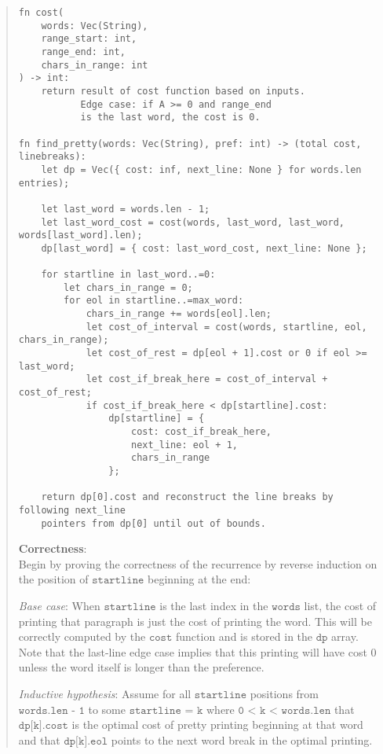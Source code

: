 \documentclass[11pt]{article}
\newcommand{\code}[1]{$\texttt{#1}$}
\begin{document}
\begin{enumerate}
\begin{enumerate}
\begin{quote}
\newpage
\begin{Verbatim}[xleftmargin=-6em]
fn cost(
    words: Vec(String), 
    range_start: int, 
    range_end: int, 
    chars_in_range: int
) -> int:
    return result of cost function based on inputs. 
           Edge case: if A >= 0 and range_end 
           is the last word, the cost is 0.

fn find_pretty(words: Vec(String), pref: int) -> (total cost, linebreaks):
    let dp = Vec({ cost: inf, next_line: None } for words.len entries);

    let last_word = words.len - 1;
    let last_word_cost = cost(words, last_word, last_word, words[last_word].len);
    dp[last_word] = { cost: last_word_cost, next_line: None };

    for startline in last_word..=0:
        let chars_in_range = 0;
        for eol in startline..=max_word:
            chars_in_range += words[eol].len;
            let cost_of_interval = cost(words, startline, eol, chars_in_range);
            let cost_of_rest = dp[eol + 1].cost or 0 if eol >= last_word;
            let cost_if_break_here = cost_of_interval + cost_of_rest;
            if cost_if_break_here < dp[startline].cost:
                dp[startline] = {
                    cost: cost_if_break_here,
                    next_line: eol + 1,
                    chars_in_range
                };
      
    return dp[0].cost and reconstruct the line breaks by following next_line
    pointers from dp[0] until out of bounds.
\end{Verbatim}

\medskip
\textbf{Correctness}: \\
Begin by proving the correctness of the recurrence by reverse induction on the position of \code{startline} beginning at the end:

\medskip
\textit{Base case}: When \code{startline} is the last index in the \code{words} list, the cost of printing that paragraph is just the cost of printing the word. This will be correctly computed by the \code{cost} function and is stored in the \code{dp} array. Note that the last-line edge case implies that this printing will have cost $0$ unless the word itself is longer than the preference.

\medskip
\textit{Inductive hypothesis}: Assume for all \code{startline} positions from \code{words.len - 1} to some \code{startline = k} where \code{0 < k < words.len} that \code{dp[k].cost} is the optimal cost of pretty printing beginning at that word and that \code{dp[k].eol} points to the next word break in the optimal printing.


\end{quote}
\end{enumerate}
\end{enumerate}
\end{document}
